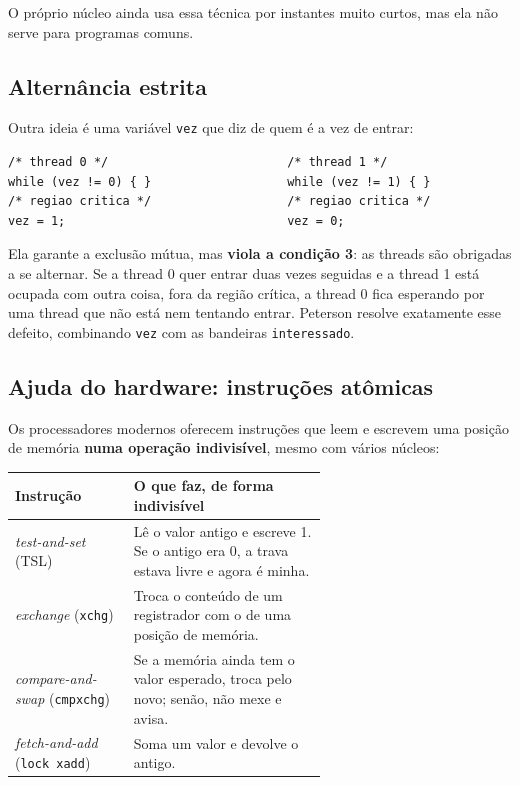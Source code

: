 \documentclass[11pt,a4paper]{article}
\newcommand{\cmd}[1]{\texttt{#1}}
\begin{document}
O próprio núcleo ainda usa essa técnica por instantes muito curtos, mas ela não serve para programas comuns.

\subsection{Alternância estrita}

Outra ideia é uma variável \cmd{vez} que diz de quem é a vez de entrar:

\begin{lstlisting}[style=codigo]
/* thread 0 */                         /* thread 1 */
while (vez != 0) { }                   while (vez != 1) { }
/* regiao critica */                   /* regiao critica */
vez = 1;                               vez = 0;
\end{lstlisting}

Ela garante a exclusão mútua, mas \textbf{viola a condição 3}: as threads são obrigadas a se alternar. Se a thread 0 quer entrar duas vezes seguidas e a thread 1 está ocupada com outra coisa, fora da região crítica, a thread 0 fica esperando por uma thread que não está nem tentando entrar. Peterson resolve exatamente esse defeito, combinando \cmd{vez} com as bandeiras \cmd{interessado}.

\subsection{Ajuda do hardware: instruções atômicas}\label{sec:hardware}

Os processadores modernos oferecem instruções que leem e escrevem uma posição de memória \textbf{numa operação indivisível}, mesmo com vários núcleos:

\begin{center}
\begin{tabular}{@{}lR{0.62\linewidth}@{}}
\toprule
\textbf{Instrução} & \textbf{O que faz, de forma indivisível} \\
\midrule
\emph{test-and-set} (TSL) & Lê o valor antigo e escreve 1. Se o antigo era 0, a trava estava livre e agora é minha. \\
\emph{exchange} (\cmd{xchg}) & Troca o conteúdo de um registrador com o de uma posição de memória. \\
\emph{compare-and-swap} (\cmd{cmpxchg}) & Se a memória ainda tem o valor esperado, troca pelo novo; senão, não mexe e avisa. \\
\emph{fetch-and-add} (\cmd{lock xadd}) & Soma um valor e devolve o antigo. \\
\bottomrule
\end{tabular}
\end{center}
\end{document}

